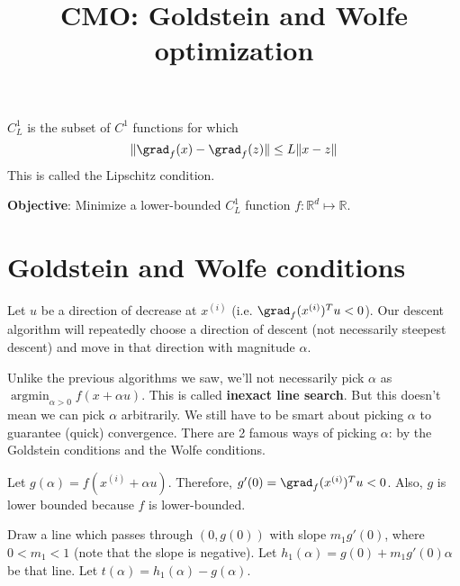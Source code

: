 


\title{CMO: Goldstein and Wolfe optimization}



\maketitle
\initMinimal{}

\begin{definition}
$C^1_L$ is the subset of $C^1$ functions for which
\[ \| \grad_f(x) - \grad_f(z) \| \le L\|x-z\| \]
This is called the Lipschitz condition.
\end{definition}

\textbf{Objective}: Minimize a lower-bounded $C^1_L$ function $f: \mathbb{R}^d \mapsto \mathbb{R}$.

\tableofcontents

\section{Goldstein and Wolfe conditions}

Let $u$ be a direction of decrease at $x^{(i)}$ (i.e. $\grad_f(x^{(i)})^Tu < 0$).
Our descent algorithm will repeatedly choose a direction of descent
(not necessarily steepest descent) and move in that direction with magnitude $\alpha$.

Unlike the previous algorithms we saw, we'll not necessarily pick $\alpha$
as $\operatorname{argmin}_{\alpha > 0} f(x + \alpha u)$.
This is called \textbf{inexact line search}.
But this doesn't mean we can pick $\alpha$ arbitrarily.
We still have to be smart about picking $\alpha$ to guarantee (quick) convergence.
There are 2 famous ways of picking $\alpha$: by the Goldstein conditions
and the Wolfe conditions.

Let $g(\alpha) = f(x^{(i)} + \alpha u)$.
Therefore, $g'(0) = \grad_f(x^{(i)})^Tu < 0$.
Also, $g$ is lower bounded because $f$ is lower-bounded.

Draw a line which passes through $(0, g(0))$ with slope $m_1 g'(0)$, where $0 < m_1 < 1$
(note that the slope is negative).
Let $h_1(\alpha) = g(0) + m_1 g'(0) \alpha$ be that line.
Let $t(\alpha) = h_1(\alpha) - g(\alpha)$.

